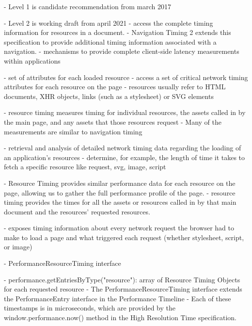 

- Level 1 is candidate recommendation from march 2017

- Level 2 is working draft from april 2021
- access the complete timing information for resources in a document.
- Navigation Timing 2 extends this specification to provide additional timing information associated with a navigation.
- mechanisms to provide complete client-side latency measurements within applications


- set of attributes for each loaded resource
- access a set of critical network timing attributes for each resource on the page
- resources usually refer to HTML documents, XHR objects, links (such as a stylesheet) or SVG elements


- resource timing measures timing for individual resources, the assets called in by the main page, and any assets that those resources request
- Many of the measurements are similar to navigation timing


- retrieval and analysis of detailed network timing data regarding the loading of an application's resources
- determine, for example, the length of time it takes to fetch a specific resource like request, svg, image, script


- Resource Timing provides similar performance data for each resource on the page, allowing us to gather the full performance profile of the page.
- resource timing provides the times for all the assets or resources called in by that main document and the resources' requested resources.


- exposes timing information about every network request the browser had to make to load a page and what triggered each request (whether stylesheet, script, or image)






- PerformanceResourceTiming interface 


- performance.getEntriesByType("resource"): array of Resource Timing Objects for each requested resource
- The PerformanceResourceTiming interface extends the PerformanceEntry interface in the Performance Timeline
- Each of these timestamps is in microseconds, which are provided by the window.performance.now() method in the High Resolution Time specification.




